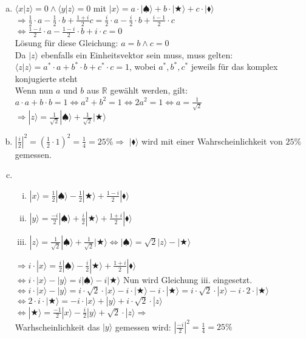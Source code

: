 \documentclass[a4paper]{scrartcl}
\begin{document}
\begin{enumerate}[a)]
\item $\langle x|z\rangle=0 \wedge \langle y|z\rangle=0$ mit $|x\rangle = a\cdot|\spadesuit\rangle+b\cdot|\bigstar\rangle+c\cdot|\blacklozenge\rangle$\\
$\Rightarrow \frac{1}{2}\cdot a-\frac{1}{2}\cdot b+\frac{1+i}{2}c = \frac{i}{2}\cdot a- \frac{i}{2}\cdot b+\frac{i-1}{2}\cdot c$\\
$\Leftrightarrow \frac{1-i}{2} \cdot a- \frac{1-i}{2} \cdot b + i \cdot c =0$\\
Lösung für diese Gleichung: $a=b \wedge c=0$\\
Da $|z\rangle$ ebenfalls ein Einheitsvektor sein muss, muss gelten:\\
$\langle z|z\rangle=a^*\cdot a+ b^* \cdot b + c^* \cdot c =1$, wobei $a^*, b^*, c^*$ jeweils für das komplex konjugierte steht\\
Wenn nun $a$ und $b$ aus $\mathbb{R}$ gewählt werden, gilt:\\
$a\cdot a+ b \cdot b =1 \Leftrightarrow a^2+b^2= 1 \Leftrightarrow 2a^2=1 \Leftrightarrow a =\frac{1}{\sqrt{2}}$\\
$\Rightarrow |z\rangle= \frac{1}{\sqrt{2}}|\spadesuit\rangle+\frac{1}{\sqrt{2}}|\bigstar\rangle$

\item $|\frac{i}{2}|^2= (\frac{1}{2}\cdot 1)^2=\frac{1}{4}=25\% \Rightarrow$ $|\blacklozenge\rangle$ wird mit einer Wahrscheinlichkeit von $25\%$ gemessen.

\item \begin{enumerate}[i.]
\item $|x\rangle= \frac{1}{2}|\spadesuit\rangle-\frac{1}{2}|\bigstar\rangle+\frac{1-i}{2}|\blacklozenge\rangle$
\item $|y\rangle= \frac{-i}{2}|\spadesuit\rangle+\frac{i}{2}|\bigstar\rangle+\frac{1+i}{2}|\blacklozenge\rangle$
\item $|z\rangle= \frac{1}{\sqrt{2}}|\spadesuit\rangle+\frac{1}{\sqrt{2}}|\bigstar\rangle \Leftrightarrow |\spadesuit\rangle = \sqrt{2}|z\rangle-|\bigstar\rangle$
\end{enumerate}

$\Rightarrow i \cdot |x\rangle = \frac{i}{2}|\spadesuit\rangle-\frac{i}{2}|\bigstar\rangle+\frac{1+i}{2}|\blacklozenge\rangle$\\
$\Leftrightarrow i \cdot |x\rangle -|y\rangle = i|\spadesuit\rangle-i|\bigstar\rangle$ Nun wird Gleichung iii. eingesetzt.\\
$\Leftrightarrow i \cdot |x\rangle -|y\rangle = i\cdot \sqrt{2}\cdot|x\rangle-i\cdot|\bigstar\rangle-i\cdot|\bigstar\rangle= i\cdot \sqrt{2}\cdot|x\rangle-i\cdot 2\cdot |\bigstar\rangle$\\
$\Leftrightarrow 2\cdot i\cdot|\bigstar\rangle= -i \cdot|x\rangle+|y\rangle+i\cdot \sqrt{2} \cdot |z\rangle$\\
$\Leftrightarrow |\bigstar\rangle= \frac{-1}{2}|x\rangle-\frac{i}{2}|y\rangle+\sqrt{2}\cdot |z\rangle \Rightarrow$\\
Warhscheinlichkeit das $|y\rangle$ gemessen wird: $|\frac{-i}{2}|^2=\frac{1}{4}=25\%$

\end{enumerate}
\newpage
\end{document}
